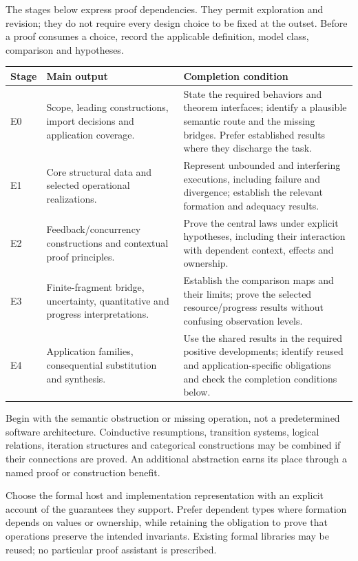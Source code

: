 \documentclass[11pt,a4paper]{article}
\begin{document}
The stages below express proof dependencies. They permit exploration and revision; they do not require every design choice to be fixed at the outset. Before a proof consumes a choice, record the applicable definition, model class, comparison and hypotheses.

\begin{longtable}{@{}p{.10\linewidth}p{.30\linewidth}p{.50\linewidth}@{}}
\toprule Stage & Main output & Completion condition\\ \midrule
\endhead
E0 & Scope, leading constructions, import decisions and application coverage. & State the required behaviors and theorem interfaces; identify a plausible semantic route and the missing bridges. Prefer established results where they discharge the task.\\
E1 & Core structural data and selected operational realizations. & Represent unbounded and interfering executions, including failure and divergence; establish the relevant formation and adequacy results.\\
E2 & Feedback/concurrency constructions and contextual proof principles. & Prove the central laws under explicit hypotheses, including their interaction with dependent context, effects and ownership.\\
E3 & Finite-fragment bridge, uncertainty, quantitative and progress interpretations. & Establish the comparison maps and their limits; prove the selected resource/progress results without confusing observation levels.\\
E4 & Application families, consequential substitution and synthesis. & Use the shared results in the required positive developments; identify reused and application-specific obligations and check the completion conditions below.\\
\bottomrule
\end{longtable}

Begin with the semantic obstruction or missing operation, not a predetermined software architecture. Coinductive resumptions, transition systems, logical relations, iteration structures and categorical constructions may be combined if their connections are proved. An additional abstraction earns its place through a named proof or construction benefit.

Choose the formal host and implementation representation with an explicit account of the guarantees they support. Prefer dependent types where formation depends on values or ownership, while retaining the obligation to prove that operations preserve the intended invariants. Existing formal libraries may be reused; no particular proof assistant is prescribed.
\end{document}

